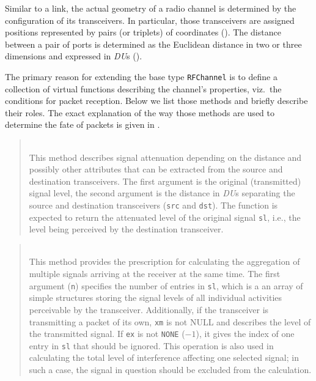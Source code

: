 \medskip

Similar to a link, the actual geometry of a radio channel is determined by
the configuration of its transceivers.
In particular, those transceivers are assigned positions represented by
pairs (or triplets) of coordinates ().
The distance between a pair of ports is determined as the Euclidean distance
in two or three dimensions and expressed in {\em DU\/}s ().

The primary reason for extending the base type {\tt RFChannel} is to define
a collection of virtual functions describing the channel's properties, viz.\ the
conditions for packet reception.
Below we list those methods and briefly describe their roles.
The exact explanation of the way those methods are used to determine the
fate of packets is given in .

\medskip

\begin{quote}
\noindent{} \hspace{0in}\vspace{0.05in}\\
\noindent
This method describes signal attenuation depending on the distance and possibly
other attributes that can be extracted from the source and destination
transceivers.
The first argument is the original (transmitted) signal level, the second
argument is the distance in {\em DU\/}s separating the source and destination
transceivers ({\tt src} and {\tt dst}).
The function is expected to return
the attenuated level of the original signal {\tt sl}, i.e., the level being
perceived by the destination transceiver.
\end{quote}

\begin{quote}
\noindent{} \hspace{0in}\vspace{0.05in}\\
\noindent
This method provides the prescription for calculating the aggregation of
multiple signals arriving at the receiver at the same time.
The first argument ({\tt n})
specifies the number of entries in {\tt sl}, which is a
an array of simple structures storing the signal levels of all individual
activities perceivable by the transceiver.
Additionally, if the transceiver is transmitting a packet of its own,
{\tt xm} is not NULL and describes the level of
the transmitted signal.
If {\tt ex} is not {\tt NONE} ($-1$), it gives the index of one entry
in {\tt sl} that should be ignored.
This operation is also used in calculating the total level of interference
affecting one selected signal; in such a case, the signal in question should be
excluded from the calculation.
\end{quote}


